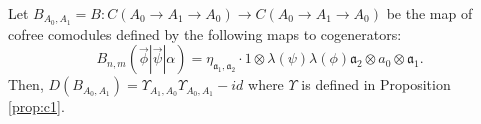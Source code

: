 %
\begin{prop}
\label{prop:c2}
Let 
$B_{A_0,A_1} = B:C(A_0 \to A_1 \to A_0)
\longrightarrow C(A_0 \to A_1 \to A_0)$ 
be the map of cofree comodules defined by 
the following maps to cogenerators:
\begin{equation}
\label{eq:def_sigma}
B_{n, m} (\vec{\phi} | \vec{\psi} | \alpha) 
= \eta_{\mathfrak{a}_1,\mathfrak{a}_2}\cdot
1 \otimes \lambda(\psi)\lambda(\phi) \mathfrak{a}_2 \otimes a_0 \otimes \mathfrak{a}_1.
\end{equation}
Then, $D(B_{A_0,A_1}) = \Upsilon_{A_1,A_0}\Upsilon_{A_0,A_1} - id$ where
$\Upsilon$ is defined in Proposition 
\ref{prop:c1}.
\end{prop}
%
